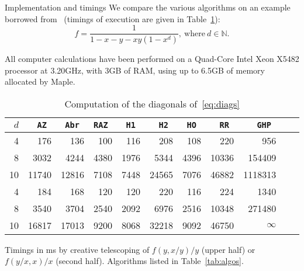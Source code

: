 \documentclass{sig-alt-full}
\newcommand{\bN}{\mathbb{N}}
\begin{document}
\begin{section}{Implementation and timings}
We compare the various algorithms
on an example borrowed from~\cite{Flaxman-2004-SMM}
(timings of execution are given in Table~\ref{tab:diags}):
\begin{equation}\label{eq:diags}
f = \frac{1}{1-x-y-xy(1-x^d)}, \ \text{where} \ d \in \bN.
\end{equation}


All computer calculations have been performed on a Quad-Core Intel
Xeon X5482 processor at 3.20GHz, with 3GB of RAM, using up to 6.5GB of
memory allocated by Maple.

\begin{table}
\begin{scriptsize}
\begin{center}
\begin{tabular}{r|rrrrrrrrrr}
$d$ & \tt AZ & \tt Abr & \tt RAZ & \tt H1 & \tt H2 & \tt HO & \tt RR & \tt GHP \\
\hline
4 & 176 & 136 & 100 & 116 & 208 & 108 & 220 & 956 \\
8 & 3032 & 4244 & 4380 & 1976 & 5344 & 4396 & 10336 & 154409 \\
10 & 11740 & 12816 & 7108 & 7448 & 24565 & 7076 & 46882 & 1118313 \\
\hline
4 & 184 & 168 & 120 & 120 & 220 & 116 & 224 & 1340 \\
8 & 3540 & 3704 & 2540 & 2092 & 6976 & 2516 & 10348 & 271480 \\
10 & 16817 & 17013 & 9200 & 8068 & 32218 & 9092 & 46750 & $\infty$
\end{tabular}
\end{center}
\end{scriptsize}
\vskip-12pt
\caption{Computation of the diagonals of~\eqref{eq:diags}}\label{tab:diags}
\begin{small}
Timings in ms by creative telescoping of $f(y,x/y)/y$ (upper half) or
$f(y/x,x)/x$ (second half).  Algorithms listed in Table~\ref{tab:algos}.
\end{small}
\end{table}


\end{section}
\end{document}
